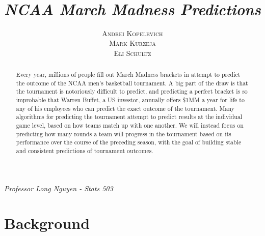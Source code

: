 \documentclass[10pt,a4paper, hidelinks]{article} %
\begin{document}
\pagestyle{plain} 
\title{\color{harvard}\rmfamily{} \\ \vspace{-.4cm}\hfill\\ {\LARGE \textit{NCAA March Madness Predictions}}}
\author{\textsc{Andrei Kopelevich}\\ \textsc{Mark Kurzeja}\\ \textsc{Eli Schultz} }
\date{} %

\maketitle

\mbox{}
\vfill

\begin{center}
	\large \color{harvard}   \textit{Professor Long Nguyen - Stats 503} \\  
\end{center}

\newpage

\hfill
\vspace{1cm}\hfill

\begin{abstract}
	Every year, millions of people fill out March Madness brackets in attempt to predict the outcome of the NCAA men's basketball tournament. A big part of the draw is that the tournament is notoriously difficult to predict, and predicting a perfect bracket is so improbable that Warren Buffet, a US investor, annually offers \$1MM a year for life to any of his employees who can predict the exact outcome of the tournament. Many algorithms for predicting the tournament attempt to predict results at the individual game level, based on how teams match up with one another. We will instead focus on predicting how many rounds a team will progress in the tournament based on its performance over the course of the preceding season, with the goal of building stable and consistent predictions of tournament outcomes.
\end{abstract}
\tableofcontents
\newpage

\section{Background}
\end{document}
